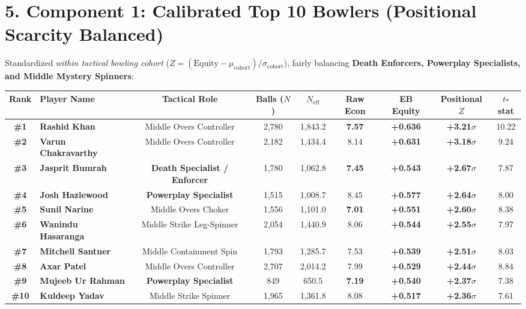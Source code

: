 \documentclass[10pt,a4paper]{article}
\begin{document}
\clearpage

\section*{5. Component 1: Calibrated Top 10 Bowlers (Positional Scarcity Balanced)}

Standardized \textit{within tactical bowling cohort} ($Z = (\text{Equity} - \mu_{\text{cohort}})/\sigma_{\text{cohort}}$), fairly balancing \textbf{Death Enforcers, Powerplay Specialists, and Middle Mystery Spinners}:

\begin{center}
\small
\begin{tabularx}{\textwidth}{c l c c c c c c c}
\toprule
\textbf{Rank} & \textbf{Player Name} & \textbf{Tactical Role} & \textbf{Balls ($N$)} & \textbf{$N_{\text{eff}}$} & \textbf{Raw Econ} & \textbf{EB Equity} & \textbf{Positional $Z$} & \textbf{$t$-stat} \\
\midrule
\textbf{\#1} & \textbf{Rashid Khan} & Middle Overs Controller & 2,780 & 1,843.2 & \textbf{7.57} & \textbf{+0.636} & \textbf{+3.21$\sigma$} & 10.22 \\
\textbf{\#2} & \textbf{Varun Chakravarthy} & Middle Overs Controller & 2,182 & 1,434.4 & 8.14 & \textbf{+0.631} & \textbf{+3.18$\sigma$} & 9.24 \\
\textbf{\#3} & \textbf{Jasprit Bumrah} & \textbf{Death Specialist / Enforcer} & 1,780 & 1,062.8 & \textbf{7.45} & \textbf{+0.543} & \textbf{+2.67$\sigma$} & 7.87 \\
\textbf{\#4} & \textbf{Josh Hazlewood} & \textbf{Powerplay Specialist} & 1,515 & 1,008.7 & 8.45 & \textbf{+0.577} & \textbf{+2.64$\sigma$} & 8.00 \\
\textbf{\#5} & \textbf{Sunil Narine} & Middle Overs Choker & 1,556 & 1,101.0 & \textbf{7.01} & \textbf{+0.551} & \textbf{+2.60$\sigma$} & 8.38 \\
\textbf{\#6} & \textbf{Wanindu Hasaranga} & Middle Strike Leg-Spinner & 2,054 & 1,440.9 & 8.06 & \textbf{+0.544} & \textbf{+2.55$\sigma$} & 7.97 \\
\textbf{\#7} & \textbf{Mitchell Santner} & Middle Containment Spin & 1,793 & 1,285.7 & 7.53 & \textbf{+0.539} & \textbf{+2.51$\sigma$} & 8.03 \\
\textbf{\#8} & \textbf{Axar Patel} & Middle Overs Controller & 2,707 & 2,014.2 & 7.99 & \textbf{+0.529} & \textbf{+2.44$\sigma$} & 8.84 \\
\textbf{\#9} & \textbf{Mujeeb Ur Rahman} & \textbf{Powerplay Specialist} & 849 & 650.5 & \textbf{7.19} & \textbf{+0.540} & \textbf{+2.37$\sigma$} & 7.38 \\
\textbf{\#10} & \textbf{Kuldeep Yadav} & Middle Strike Spinner & 1,965 & 1,361.8 & 8.08 & \textbf{+0.517} & \textbf{+2.36$\sigma$} & 7.61 \\
\bottomrule
\end{tabularx}
\end{center}
\end{document}
